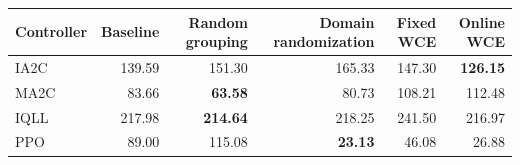 \begin{tabular}{lrrrrr}
\hline
Controller & Baseline & Random grouping & Domain randomization & Fixed WCE & Online WCE \\
\hline
IA2C & 139.59 & 151.30 & 165.33 & 147.30 & \textbf{126.15} \\
MA2C & 83.66 & \textbf{63.58} & 80.73 & 108.21 & 112.48 \\
IQLL & 217.98 & \textbf{214.64} & 218.25 & 241.50 & 216.97 \\
PPO & 89.00 & 115.08 & \textbf{23.13} & 46.08 & 26.88 \\
\hline
\end{tabular}
